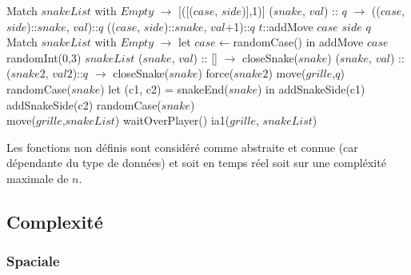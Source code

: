 \documentclass[a4paper,12pt]{report}
\begin{document}
\begin{algorithmic}
	\State Match $snakeList$ with
	\State $Empty$ $\rightarrow$ [([($case$, $side$)],1)]
	\State ($snake$, $val$) :: $q$ $\rightarrow$
				\State (($case$, $side$)::$snake$, $val$)::$q$
			\Else
				\State (($case$, $side$)::$snake$, $val$+1)::$q$
			\EndIf
		\Else
			\State $t$::addMove $case$ $side$ $q$
		\EndIf
\EndFunction
\\
	\State Match $snakeList$ with
	\State $Empty$ $\rightarrow$ let $case\gets$randomCase() in addMove $case$ randomInt(0,3) $snakeList$
	\State ($snake$, $val$) :: [] $\rightarrow$
			\State closeSnake($snake$)
		\EndIf
	\State ($snake$, $val$) :: ($snake2$, $val2$)::$q$ $\rightarrow$
			\State closeSnake($snake$)
		\Else
				\State force($snake2$)
			\Else
				\State move($grille$,$q$)
			\EndIf
		\EndIf
\EndFunction
\\
		\State randomCase($snake$)
	\EndIf
	\State let (c1, c2) = snakeEnd($snake$) in
		\State addSnakeSide(c1)
	\Else
			\State addSnakeSide(c2)
			\Else randomCase($snake$)
		\EndIf
	\EndIf
\EndFunction
\\
	\State move($grille$,$snakeList$)
	\State waitOverPlayer()
	\State ia1($grille$, $snakeList$)
\EndFunction
\end{algorithmic}
Les fonctions non d\'efinis sont consid\'er\'e comme abstraite et connue (car d\'ependante du type de donn\'ees) et soit en temps r\'eel soit sur une compl\'exit\'e maximale de $n$. 

\subsection{Complexit\'e}

\subsubsection{Spaciale}
\end{document}
